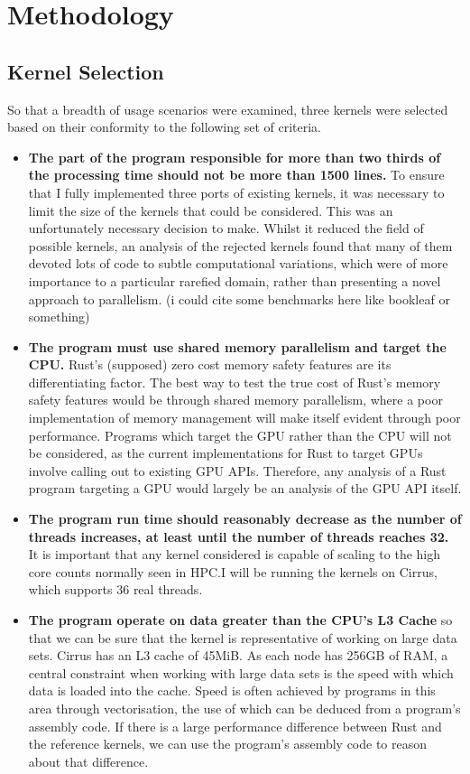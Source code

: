 \chapter{Methodology}
\section{Kernel Selection}
So that a breadth of usage scenarios were examined, three kernels were selected based on their conformity to the following set of criteria.
\begin{itemize}
  \item \textbf{The part of the program responsible for more than two thirds of the processing time should not be more than 1500 lines.} To ensure that I fully implemented three ports of existing kernels, it was necessary to limit the size of the kernels that could be considered. This was an unfortunately necessary decision to make. Whilst it reduced the field of possible kernels, an analysis of the rejected kernels found that many of them devoted lots of code to subtle computational variations, which were of more importance to a particular rarefied domain, rather than presenting a novel approach to parallelism. (i could cite some benchmarks here like bookleaf or something)

  \item \textbf{The program must use shared memory parallelism and target the CPU.} Rust's (supposed) zero cost memory safety features are its differentiating factor. The best way to test the true cost of Rust's memory safety features would be through shared memory parallelism, where a poor implementation of memory management will make itself evident through poor performance. Programs which target the GPU rather than the CPU will not be considered, as the current implementations for Rust to target GPUs involve calling out to existing GPU APIs. Therefore, any analysis of a Rust program targeting a GPU would largely be an analysis of the GPU API itself.

  \item \textbf{The program run time should reasonably decrease as the number of threads increases, at least until the number of threads reaches 32.} It is important that any kernel considered is capable of scaling to the high core counts normally seen in HPC.I will be running the kernels on Cirrus, which supports 36 real threads.

  \item \textbf{The program operate on data greater than the CPU's L3 Cache} so that we can be sure that the kernel is representative of working on large data sets. Cirrus has an L3 cache of 45MiB. As each node has 256GB of RAM, a central constraint when working with large data sets is the speed with which data is loaded into the cache. Speed is often achieved by programs in this area through vectorisation, the use of which can be deduced from a program's assembly code. If there is a large performance difference between Rust and the reference kernels, we can use the program's assembly code to reason about that difference.


\end{itemize}
